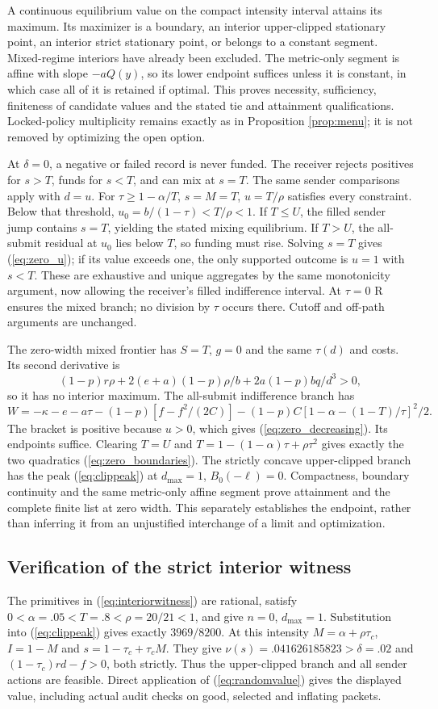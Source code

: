 \documentclass[11pt]{article}
\begin{document}
A continuous equilibrium value on the compact intensity interval attains its maximum. Its maximizer is a boundary, an interior upper-clipped stationary point, an interior strict stationary point, or belongs to a constant segment. Mixed-regime interiors have already been excluded. The metric-only segment is affine with slope $-aQ(y)$, so its lower endpoint suffices unless it is constant, in which case all of it is retained if optimal. This proves necessity, sufficiency, finiteness of candidate values and the stated tie and attainment qualifications. Locked-policy multiplicity remains exactly as in Proposition \ref{prop:menu}; it is not removed by optimizing the open option.

At $\delta=0$, a negative or failed record is never funded. The receiver rejects positives for $s>T$, funds for $s<T$, and can mix at $s=T$. The same sender comparisons apply with $d=u$. For $\tau\geq1-\alpha/T$, $s=M=T$, $u=T/\rho$ satisfies every constraint. Below that threshold, $u_0=b/(1-\tau)<T/\rho<1$. If $T\leq U$, the filled sender jump contains $s=T$, yielding the stated mixing equilibrium. If $T>U$, the all-submit residual at $u_0$ lies below $T$, so funding must rise. Solving $s=T$ gives (\ref{eq:zero_u}); if its value exceeds one, the only supported outcome is $u=1$ with $s<T$. These are exhaustive and unique aggregates by the same monotonicity argument, now allowing the receiver's filled indifference interval. At $\tau=0$ R ensures the mixed branch; no division by $\tau$ occurs there. Cutoff and off-path arguments are unchanged.

The zero-width mixed frontier has $S=T$, $g=0$ and the same $\tau(d)$ and costs. Its second derivative is
\[
(1-p)r\rho+2(e+a)(1-p)\rho/b+2a(1-p)bq/d^3>0,
\]
so it has no interior maximum. The all-submit indifference branch has
\[
W= -\kappa-e-a\tau-(1-p)[f-f^2/(2C)]
 -(1-p)C[1-\alpha-(1-T)/\tau]^2/2.
\]
The bracket is positive because $u>0$, which gives (\ref{eq:zero_decreasing}). Its endpoints suffice. Clearing $T=U$ and $T=1-(1-\alpha)\tau+\rho\tau^2$ gives exactly the two quadratics (\ref{eq:zero_boundaries}). The strictly concave upper-clipped branch has the peak (\ref{eq:clippeak}) at $d_{\max}=1$, $B_0(-\ell)=0$. Compactness, boundary continuity and the same metric-only affine segment prove attainment and the complete finite list at zero width. This separately establishes the endpoint, rather than inferring it from an unjustified interchange of a limit and optimization.

\subsection{Verification of the strict interior witness}\label{app:random_witness}
The primitives in (\ref{eq:interiorwitness}) are rational, satisfy $0<\alpha=.05<T=.8<\rho=20/21<1$, and give $n=0$, $d_{\max}=1$. Substitution into (\ref{eq:clippeak}) gives exactly $3969/8200$. At this intensity $M=\alpha+\rho\tau_c$, $I=1-M$ and $s=1-\tau_c+\tau_c M$. They give $\nu(s)=.041626185823>\delta=.02$ and $(1-\tau_c)rd-f>0$, both strictly. Thus the upper-clipped branch and all sender actions are feasible. Direct application of (\ref{eq:randomvalue}) gives the displayed value, including actual audit checks on good, selected and inflating packets.
\end{document}
